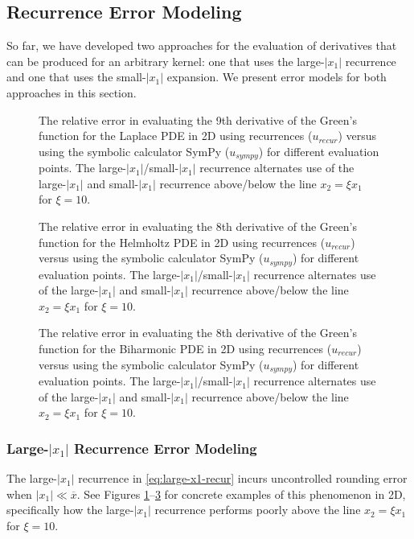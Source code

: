 \documentclass[12pt]{article}
\theoremstyle{definition}
\theoremstyle{plain}
\theoremstyle{definition}
\begin{document}
\subsection{Recurrence Error Modeling}
\label{sec:error-modeling}
So far, we have developed two approaches for the evaluation of derivatives that can be produced for an arbitrary kernel: one that uses the large-$|x_1|$ recurrence and one that uses the small-$|x_1|$ expansion. We present error models for both approaches in this section.

\begin{figure}[h]
\centering

\caption{The relative error in evaluating the 9th derivative of the Green's function for the Laplace PDE in 2D using recurrences ($u_{recur}$) versus using the symbolic calculator SymPy ($u_{sympy}$) \cite{10.7717/peerj-cs.103} for different evaluation points. The large-$|x_1|$/small-$|x_1|$ recurrence alternates use of the large-$|x_1|$ and small-$|x_1|$ recurrence above/below the line $x_2 = \xi x_1$ for $\xi =10$.}
\label{figure:Laplace2D9thOrder}
\end{figure}

\begin{figure}[h]
\centering

\caption{The relative error in evaluating the 8th derivative of the Green's function for the Helmholtz PDE in 2D using recurrences ($u_{recur}$) versus using the symbolic calculator SymPy ($u_{sympy}$) \cite{10.7717/peerj-cs.103} for different evaluation points. The large-$|x_1|$/small-$|x_1|$ recurrence alternates use of the large-$|x_1|$ and small-$|x_1|$ recurrence above/below the line $x_2 = \xi x_1$ for $\xi = 10$.}
\label{figure:Helmholtz2D8thOrder}
\end{figure}

\begin{figure}[h]
\centering

\caption{The relative error in evaluating the 8th derivative of the Green's function for the Biharmonic PDE in 2D using recurrences ($u_{recur}$) versus using the symbolic calculator SymPy ($u_{sympy}$) \cite{10.7717/peerj-cs.103} for different evaluation points. The large-$|x_1|$/small-$|x_1|$ recurrence alternates use of the large-$|x_1|$ and small-$|x_1|$ recurrence above/below the line $x_2= \xi x_1$ for $\xi = 10$.}
\label{figure:Biharmonic2D7thOrder}
\end{figure}

\subsubsection{Large-$|x_1|$ Recurrence Error Modeling}
\label{sec:large-x1-error-model}
The large-$|x_1|$ recurrence in \eqref{eq:large-x1-recur} incurs uncontrolled rounding error when $|x_1| \ll \overline{x}$. See Figures \ref{figure:Laplace2D9thOrder}--\ref{figure:Biharmonic2D7thOrder} for concrete examples of this phenomenon in 2D, specifically how the large-$|x_1|$ recurrence performs poorly above the line $x_2 = \xi x_1$ for $\xi = 10$. 
\end{document}
